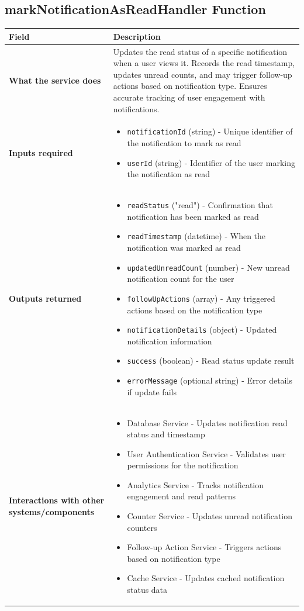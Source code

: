 \documentclass[11pt,a4paper]{article}
\begin{document}
\subsection{markNotificationAsReadHandler Function}

\begin{longtable}{|p{4cm}|p{12cm}|}
\hline
\textbf{Field} & \textbf{Description} \\
\hline
\textbf{What the service does} & 
Updates the read status of a specific notification when a user views it. Records the read timestamp, updates unread counts, and may trigger follow-up actions based on notification type. Ensures accurate tracking of user engagement with notifications. \\
\hline
\textbf{Inputs required} & 
\begin{itemize}[nosep]
\item \texttt{notificationId} (string) - Unique identifier of the notification to mark as read
\item \texttt{userId} (string) - Identifier of the user marking the notification as read
\end{itemize} \\
\hline
\textbf{Outputs returned} & 
\begin{itemize}[nosep]
\item \texttt{readStatus} ("read") - Confirmation that notification has been marked as read
\item \texttt{readTimestamp} (datetime) - When the notification was marked as read
\item \texttt{updatedUnreadCount} (number) - New unread notification count for the user
\item \texttt{followUpActions} (array) - Any triggered actions based on the notification type
\item \texttt{notificationDetails} (object) - Updated notification information
\item \texttt{success} (boolean) - Read status update result
\item \texttt{errorMessage} (optional string) - Error details if update fails
\end{itemize} \\
\hline
\textbf{Interactions with other systems/components} & 
\begin{itemize}[nosep]
\item Database Service - Updates notification read status and timestamp
\item User Authentication Service - Validates user permissions for the notification
\item Analytics Service - Tracks notification engagement and read patterns
\item Counter Service - Updates unread notification counters
\item Follow-up Action Service - Triggers actions based on notification type
\item Cache Service - Updates cached notification status data
\end{itemize} \\
\hline
\end{longtable}
\end{document}
